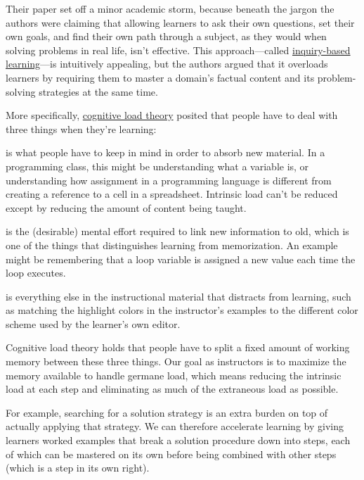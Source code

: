 Their paper set off a minor academic storm, because beneath the jargon
the authors were claiming that allowing learners to ask their own
questions, set their own goals, and find their own path through a
subject, as they would when solving problems in real life, isn't
effective. This approach---called
\protect\hyperlink{g:inquiry-based-learning}{inquiry-based learning}---is
intuitively appealing, but the authors argued that it overloads learners
by requiring them to master a domain's factual content and its
problem-solving strategies at the same time.

More specifically, \protect\hyperlink{g:cognitive-load-theory}{cognitive load theory}
posited that people have to deal with three things when they're
learning:

\begin{description}
\tightlist
\item[Intrinsic load]
is what people have to keep in mind in order to absorb new material.
In a programming class, this might be understanding what a variable
is, or understanding how assignment in a programming language is
different from creating a reference to a cell in a spreadsheet.
Intrinsic load can't be reduced except by reducing the amount of
content being taught.
\item[Germane load]
is the (desirable) mental effort required to link new information to
old, which is one of the things that distinguishes learning from
memorization. An example might be remembering that a loop variable
is assigned a new value each time the loop executes.
\item[Extraneous load]
is everything else in the instructional material that distracts from
learning, such as matching the highlight colors in the instructor's
examples to the different color scheme used by the learner's own
editor.
\end{description}

Cognitive load theory holds that people have to split a fixed amount of
working memory between these three things. Our goal as instructors is to
maximize the memory available to handle germane load, which means
reducing the intrinsic load at each step and eliminating as much of the
extraneous load as possible.

For example, searching for a solution strategy is an extra burden on top
of actually applying that strategy. We can therefore accelerate learning
by giving learners worked examples that break a solution procedure down
into steps, each of which can be mastered on its own before being
combined with other steps (which is a step in its own right).

